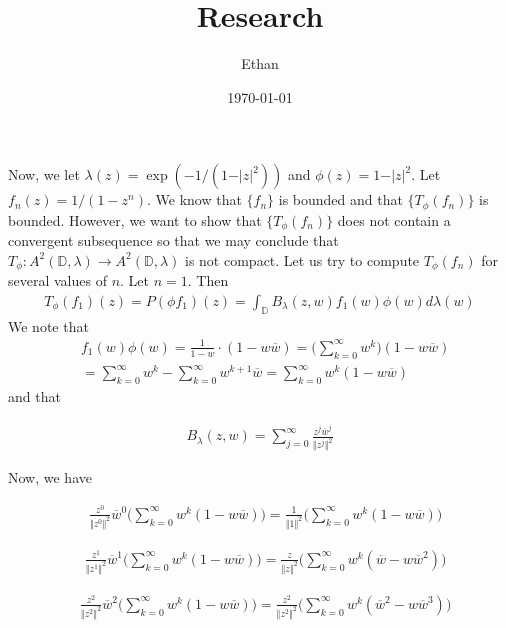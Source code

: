 \documentclass[12pt]{article}
\begin{document}
 
\title{Research}
\author{Ethan}
\date{\today}
\maketitle
{}
\hfuzz=50pt
\noindent
Now, we let $\lambda(z) = \exp(-1/(1-\vert z\vert^2))$ and $\phi(z) = 1 - \vert z \vert^2$. Let $f_n(z) = 1/(1-z^n)$. We know that $\{f_n\}$ is bounded and that $\{T_\phi(f_n)\}$ is bounded. However, we want to show that $\{T_\phi(f_n)\}$ does not contain a convergent subsequence so that we may conclude that $T_\phi: A^2(\mathbb{D},\lambda) \rightarrow A^2(\mathbb{D},\lambda)$ is not compact. Let us try to compute $T_\phi(f_n)$ for several values of $n$. Let $n = 1$. Then
\begin{align}
T_\phi(f_1)(z) = P(\phi f_1)(z) = \int_\mathbb{D} B_\lambda(z,w) f_1(w) \phi(w) d\lambda(w)
\end{align}
We note that
\begin{align}
&f_1(w) \phi(w) = \frac{1}{1-w} \cdot (1-w\overline{w}) = \Bigg(\sum_{k=0}^\infty w^k\Bigg)(1 - w\overline{w}) 
\\ &= \sum_{k=0}^\infty w^k - \sum_{k = 0}^\infty w^{k+1} \overline{w} = \sum_{k=0}^\infty w^k(1- w\overline{w})
\end{align} and that

\begin{align}
B_\lambda(z,w) = \sum_{j=0}^\infty \frac{z^j \overline{w}^j}{\Vert z^j \Vert^2} 
\end{align}

 Now, we have

\begin{align}
&\frac{z^0}{\Vert z^0 \Vert^2} \overline{w}^0 \Bigg( \sum_{k=0}^\infty w^k(1- w\overline{w}) \Bigg)= \frac{1}{\Vert 1 \Vert^2} \Bigg( \sum_{k=0}^\infty w^k(1- w\overline{w}) \Bigg)
\end{align}

\begin{align}
&\frac{z^1}{\Vert z^1 \Vert^2} \overline{w}^1 \Bigg( \sum_{k=0}^\infty w^k(1- w\overline{w}) \Bigg)= \frac{z}{\Vert z \Vert^2} \Bigg( \sum_{k=0}^\infty w^k(\overline{w}- w\overline{w}^2) \Bigg)
\end{align}

\begin{align}
&\frac{z^2}{\Vert z^2 \Vert^2} \overline{w}^2 \Bigg( \sum_{k=0}^\infty w^k(1- w\overline{w}) \Bigg)= \frac{z^2}{\Vert z^2 \Vert^2} \Bigg( \sum_{k=0}^\infty w^k(\overline{w}^2- w\overline{w}^3) \Bigg)
\end{align}
\end{document}
